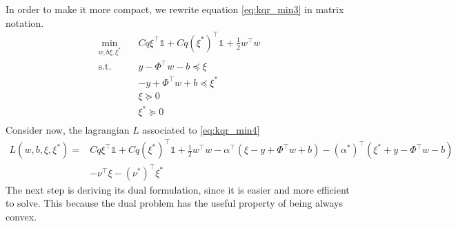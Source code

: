 In order to make it more compact, we rewrite equation \ref{eq:kqr_min3} in matrix notation.
\begin{equation}\label{eq:kqr_min4}
    \begin{aligned}
        \min_{w,b\xi,\xi^*} \quad & C q \xi^\intercal \mathbb{1}+ C q (\xi^*)^\intercal \mathbb{1}+ \frac{1}{2}w^\intercal w\\
    \textrm{s.t.} \quad & y-\Phi^\intercal w -b \preceq \xi\\
    & -y+\Phi^\intercal w +b \preceq \xi^*\\
      &\xi\succeq0    \\
      &\xi^*\succeq0    \\
    \end{aligned}
    \end{equation}
Consider now, the lagrangian $L$ associated to \ref{eq:kqr_min4}
\begin{equation}\label{eq:kqr_min5}
    \begin{aligned}
    L(w,b,\xi,\xi^*)= & C q \xi^\intercal \mathbb{1}+ C q (\xi^*)^\intercal \mathbb{1}+ \frac{1}{2}w^\intercal w- \alpha^\intercal(\xi - y+\Phi^\intercal w +b)
    - (\alpha^*)^\intercal(\xi^* +y-\Phi^\intercal w -b)
    \\
    & -\nu^\intercal \xi - (\nu^*)^\intercal \xi^*
\end{aligned}
\end{equation}
The next step is deriving its dual formulation, since it is easier and more efficient to solve. This because the dual problem has the useful property of being always convex.

